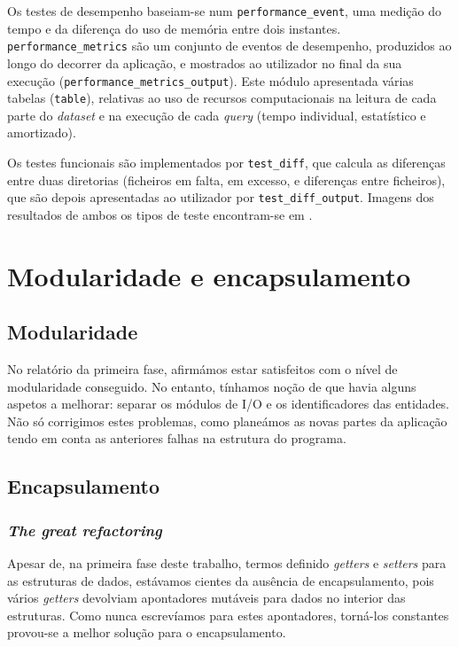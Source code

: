 \documentclass[11pt, a4paper]{article}
\begin{document}
Os testes de desempenho baseiam-se num \texttt{performance\_event}, uma medição do tempo e da
diferença do uso de memória entre dois instantes. \texttt{performance\_metrics} são um conjunto de
eventos de desempenho, produzidos ao longo do decorrer da aplicação, e mostrados ao utilizador no
final da sua execução (\texttt{performance\_metrics\_output}). Este módulo apresentada várias
tabelas (\texttt{table}), relativas ao uso de recursos computacionais na leitura de cada parte do
\emph{dataset} e na execução de cada \emph{query} (tempo individual, estatístico e amortizado).

Os testes funcionais são implementados por \texttt{test\_diff}, que calcula as diferenças entre
duas diretorias (ficheiros em falta, em excesso, e diferenças entre ficheiros), que são depois
apresentadas ao utilizador por \texttt{test\_diff\_output}. Imagens dos resultados de ambos os tipos
de teste encontram-se em .

\section{Modularidade e encapsulamento}
\label{sec:modularity-and-encapsulation}

\subsection{Modularidade}
\label{sec:modularity}

No relatório da primeira fase, afirmámos estar satisfeitos com o nível de modularidade conseguido.
No entanto, tínhamos noção de que havia alguns aspetos a melhorar: separar os módulos de I/O e os
identificadores das entidades. Não só corrigimos estes problemas, como planeámos as novas partes da
aplicação tendo em conta as anteriores falhas na estrutura do programa.

\subsection{Encapsulamento}
\label{sec:encapsulation}

\subsubsection{\emph{The great refactoring}}
\label{sec:the-great-refactoring}

Apesar de, na primeira fase deste trabalho, termos definido \emph{getters} e \emph{setters} para as
estruturas de dados, estávamos cientes da ausência de encapsulamento, pois vários \emph{getters}
devolviam apontadores mutáveis para dados no interior das estruturas. Como nunca escrevíamos para
estes apontadores, torná-los constantes provou-se a melhor solução para o encapsulamento.
\end{document}
